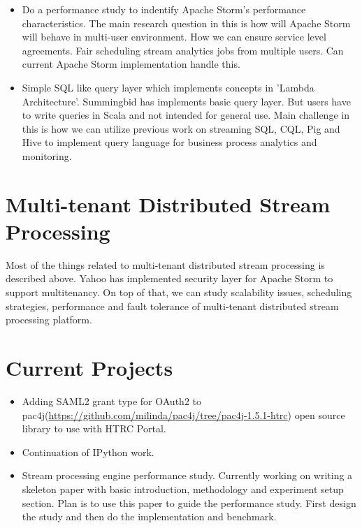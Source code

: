 \documentclass{article}
\begin{document}
\begin{itemize}
  \item Do a performance study to indentify Apache Storm's performance
    characteristics. The main research question in this is how will
    Apache Storm will behave in multi-user environment. How we can
    ensure service level agreements. Fair scheduling stream analytics
    jobs from multiple users. Can current Apache Storm implementation
    handle this.
  \item Simple SQL like query layer which implements concepts in
    'Lambda Architecture'. Summingbid has implements basic query
    layer. But users have to write queries in Scala and not intended
    for general use. Main challenge in this is how we can utilize
    previous work on streaming SQL, CQL, Pig and Hive to implement
    query language for business process analytics and monitoring.
\end{itemize}



\section{Multi-tenant Distributed Stream Processing}

Most of the things related to multi-tenant distributed stream
processing is described above. Yahoo has implemented security layer for
Apache Storm to support multitenancy. On top of that, we can
study scalability issues, scheduling strategies, performance and fault
tolerance of multi-tenant distributed stream processing platform.

\section{Current Projects}

\begin{itemize}
  \item Adding SAML2 grant type for OAuth2 to
    pac4j(\url{https://github.com/milinda/pac4j/tree/pac4j-1.5.1-htrc})
    open source library to use with HTRC Portal.
  \item Continuation of IPython work.
  \item Stream processing engine performance study. Currently working
    on writing a skeleton paper with basic introduction, methodology
    and experiment setup section. Plan is to use this paper to guide
    the performance study. First design the study and then do the
    implementation and benchmark.
\end{itemize}
\end{document}
